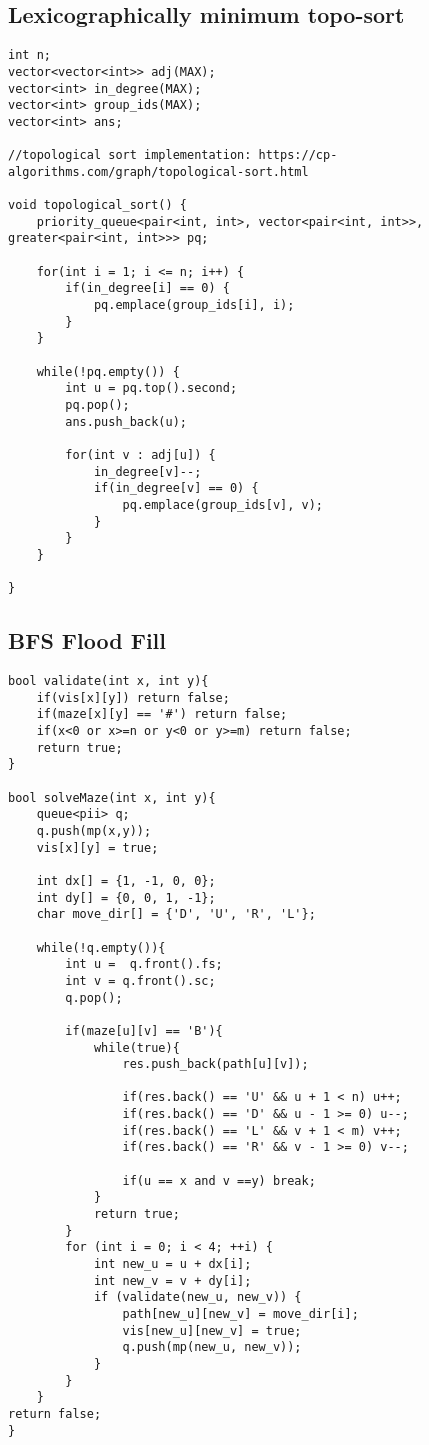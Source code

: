 \documentclass{article}
\begin{document}
\subsection{Lexicographically minimum topo-sort }
\begin{lstlisting}
int n;
vector<vector<int>> adj(MAX);
vector<int> in_degree(MAX);
vector<int> group_ids(MAX);
vector<int> ans;

//topological sort implementation: https://cp-algorithms.com/graph/topological-sort.html

void topological_sort() {
    priority_queue<pair<int, int>, vector<pair<int, int>>, greater<pair<int, int>>> pq;

    for(int i = 1; i <= n; i++) {
        if(in_degree[i] == 0) {
            pq.emplace(group_ids[i], i);
        }
    }

    while(!pq.empty()) {
        int u = pq.top().second;
        pq.pop();
        ans.push_back(u);

        for(int v : adj[u]) {
            in_degree[v]--;
            if(in_degree[v] == 0) {
                pq.emplace(group_ids[v], v);
            }
        }
    }

}
\end{lstlisting}
\subsection{BFS Flood Fill}
\begin{lstlisting}
bool validate(int x, int y){
	if(vis[x][y]) return false;
	if(maze[x][y] == '#') return false;
	if(x<0 or x>=n or y<0 or y>=m) return false;
	return true;
}
 
bool solveMaze(int x, int y){
    queue<pii> q;
    q.push(mp(x,y));
    vis[x][y] = true;

    int dx[] = {1, -1, 0, 0};
    int dy[] = {0, 0, 1, -1};
    char move_dir[] = {'D', 'U', 'R', 'L'};
 
	while(!q.empty()){
		int u =  q.front().fs;
		int v = q.front().sc;
		q.pop();
 
		if(maze[u][v] == 'B'){
			while(true){
				res.push_back(path[u][v]);
 
				if(res.back() == 'U' && u + 1 < n) u++;
				if(res.back() == 'D' && u - 1 >= 0) u--;
				if(res.back() == 'L' && v + 1 < m) v++;
				if(res.back() == 'R' && v - 1 >= 0) v--;
 
				if(u == x and v ==y) break;
			}
			return true;
		}
        for (int i = 0; i < 4; ++i) {
            int new_u = u + dx[i];
            int new_v = v + dy[i];
            if (validate(new_u, new_v)) {
                path[new_u][new_v] = move_dir[i];
                vis[new_u][new_v] = true;
                q.push(mp(new_u, new_v));
            }
        }
    }
return false;
}
\end{lstlisting}
\end{document}
